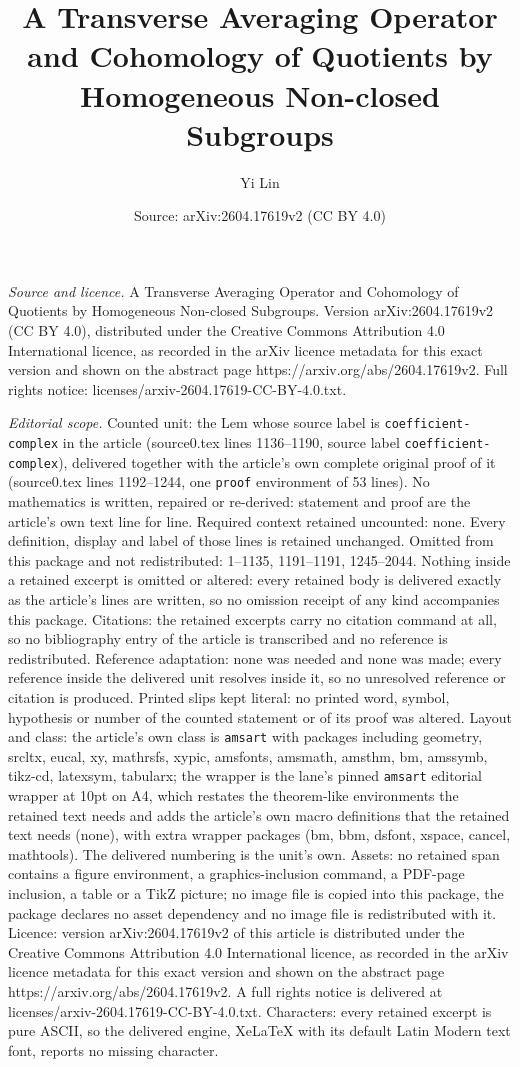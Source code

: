 \documentclass[10pt,a4paper]{amsart}
\title[A Transverse Averaging Operator and Cohomology of Quotients ]{A Transverse Averaging Operator and Cohomology of Quotients by Homogeneous Non-closed Subgroups}
\author{Yi Lin}
\date{Source: arXiv:2604.17619v2 (CC BY 4.0)}
\begin{document}
\maketitle

\noindent\emph{Source and licence.} A Transverse Averaging Operator and Cohomology of Quotients by Homogeneous Non-closed Subgroups. Version arXiv:2604.17619v2 (CC BY 4.0), distributed under the Creative Commons Attribution 4.0 International licence, as recorded in the arXiv licence metadata for this exact version and shown on the abstract page https://arxiv.org/abs/2604.17619v2. Full rights notice: licenses/arxiv-2604.17619-CC-BY-4.0.txt.\par\smallskip

\noindent\textit{Editorial scope.} Counted unit: the Lem whose source label is \texttt{coefficient-complex} in the article (source0.tex lines 1136--1190, source label \texttt{coefficient-complex}), delivered together with the article's own complete original proof of it (source0.tex lines 1192--1244, one \texttt{proof} environment of 53 lines). No mathematics is written, repaired or re-derived: statement and proof are the article's own text line for line. Required context retained uncounted: none. Every definition, display and label of those lines is retained unchanged. Omitted from this package and not redistributed: 1--1135, 1191--1191, 1245--2044. Nothing inside a retained excerpt is omitted or altered: every retained body is delivered exactly as the article's lines are written, so no omission receipt of any kind accompanies this package. Citations: the retained excerpts carry no citation command at all, so no bibliography entry of the article is transcribed and no reference is redistributed. Reference adaptation: none was needed and none was made; every reference inside the delivered unit resolves inside it, so no unresolved reference or citation is produced. Printed slips kept literal: no printed word, symbol, hypothesis or number of the counted statement or of its proof was altered. Layout and class: the article's own class is \texttt{amsart} with packages including geometry, srcltx, eucal, xy, mathrsfs, xypic, amsfonts, amsmath, amsthm, bm, amssymb, tikz-cd, latexsym, tabularx; the wrapper is the lane's pinned \texttt{amsart} editorial wrapper at 10pt on A4, which restates the theorem-like environments the retained text needs and adds the article's own macro definitions that the retained text needs (none), with extra wrapper packages (bm, bbm, dsfont, xspace, cancel, mathtools). The delivered numbering is the unit's own. Assets: no retained span contains a figure environment, a graphics-inclusion command, a PDF-page inclusion, a table or a TikZ picture; no image file is copied into this package, the package declares no asset dependency and no image file is redistributed with it. Licence: version arXiv:2604.17619v2 of this article is distributed under the Creative Commons Attribution 4.0 International licence, as recorded in the arXiv licence metadata for this exact version and shown on the abstract page https://arxiv.org/abs/2604.17619v2. A full rights notice is delivered at licenses/arxiv-2604.17619-CC-BY-4.0.txt. Characters: every retained excerpt is pure ASCII, so the delivered engine, XeLaTeX with its default Latin Modern text font, reports no missing character.
\end{document}
